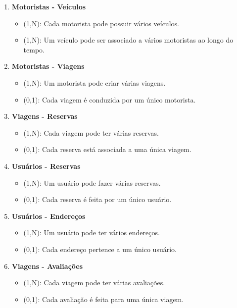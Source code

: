 \begin{enumerate}
	\item \textbf{Motoristas - Veículos}
	\begin{itemize}
		\item (1,N): Cada motorista pode possuir vários veículos.
		\item (1,N): Um veículo pode ser associado a vários motoristas ao longo do tempo.
	\end{itemize}
	
	\item \textbf{Motoristas - Viagens}
	\begin{itemize}
		\item (1,N): Um motorista pode criar várias viagens.
		\item (0,1): Cada viagem é conduzida por um único motorista.
	\end{itemize}
	
	\item \textbf{Viagens - Reservas}
	\begin{itemize}
		\item (1,N): Cada viagem pode ter várias reservas.
		\item (0,1): Cada reserva está associada a uma única viagem.
	\end{itemize}
	
	\item \textbf{Usuários - Reservas}
	\begin{itemize}
		\item (1,N): Um usuário pode fazer várias reservas.
		\item (0,1): Cada reserva é feita por um único usuário.
	\end{itemize}
	
	\item \textbf{Usuários - Endereços}
	\begin{itemize}
		\item (1,N): Um usuário pode ter vários endereços.
		\item (0,1): Cada endereço pertence a um único usuário.
	\end{itemize}
	
	\item \textbf{Viagens - Avaliações}
	\begin{itemize}
		\item (1,N): Cada viagem pode ter várias avaliações.
		\item (0,1): Cada avaliação é feita para uma única viagem.
	\end{itemize}
	

\end{enumerate}
